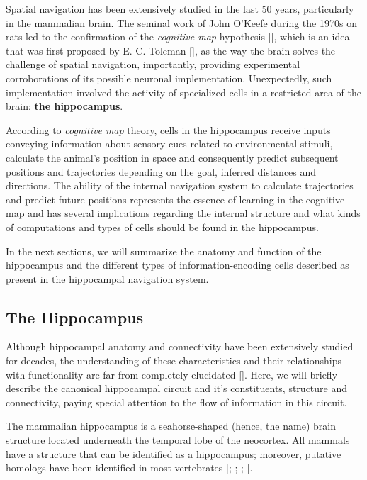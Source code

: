 Spatial navigation has been extensively studied in the last 50 years, particularly in the mammalian brain. 
The seminal work of John O'Keefe during the 1970s on rats led to the confirmation of the \textit{cognitive map} hypothesis [\cite{okeefebook}], which is an idea that was first proposed by E. C. Toleman [\cite{toleman1948}], as the way the brain solves the challenge of spatial navigation, importantly, providing experimental corroborations of its possible neuronal implementation. 
Unexpectedly, such implementation involved the activity of specialized cells in a restricted area of the brain: \hyperref[chap1:sec:1:subsec1:hippocampus]{\textbf{the hippocampus}}.

According to \textit{cognitive map} theory, cells in the hippocampus receive inputs conveying information about sensory cues related to environmental stimuli, calculate the animal's position in space and consequently predict subsequent positions and trajectories depending on the goal, inferred distances and directions. 
The ability of the internal navigation system to calculate trajectories and predict future positions represents the essence of learning in the cognitive map and has several implications regarding the internal structure and what kinds of computations and types of cells should be found in the hippocampus.

In the next sections, we will summarize the anatomy and function of the hippocampus and the different types of information-encoding cells described as present in the hippocampal navigation system.

\subsection{The Hippocampus}
\label{chap1:sec:1:subsec1:hippocampus}
Although hippocampal anatomy and connectivity have been extensively studied for decades, the understanding of these characteristics and their relationships with functionality are far from completely elucidated [\cite{cullen2017}]. 
Here, we will briefly describe the canonical hippocampal circuit and it's constituents, structure and connectivity, paying special attention to the flow of information in this circuit.

The mammalian hippocampus is a seahorse-shaped (hence, the name) brain structure located underneath the temporal lobe of the neocortex.
All mammals have a structure that can be identified as a hippocampus; moreover, putative homologs have been identified in most vertebrates [\cite{okeefebook}; \cite{kappersandcrosby}; \cite{heier1948}; \cite{crosby1966}].

